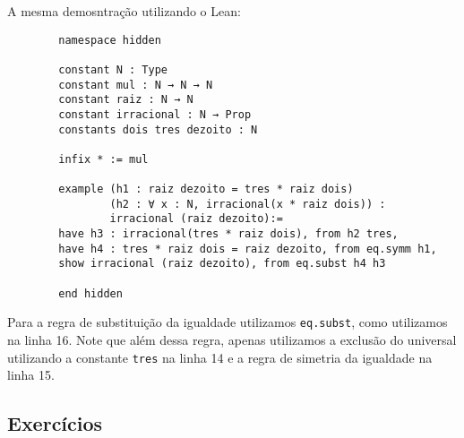         A mesma demosntração utilizando o Lean:
        \begin{lstlisting}
        namespace hidden

        constant N : Type
        constant mul : N → N → N
        constant raiz : N → N
        constant irracional : N → Prop
        constants dois tres dezoito : N

        infix * := mul

        example (h1 : raiz dezoito = tres * raiz dois)
                (h2 : ∀ x : N, irracional(x * raiz dois)) :
                irracional (raiz dezoito):=
        have h3 : irracional(tres * raiz dois), from h2 tres,
        have h4 : tres * raiz dois = raiz dezoito, from eq.symm h1,
        show irracional (raiz dezoito), from eq.subst h4 h3

        end hidden
        \end{lstlisting}
        Para a regra de substituição da igualdade utilizamos \lstinline{eq.subst}, como utilizamos na linha 16.
        Note que além dessa regra, apenas utilizamos a exclusão do universal utilizando a constante \lstinline{tres}
        na linha 14 e a regra de simetria da igualdade na linha 15.

    \subsection{Exercícios}

